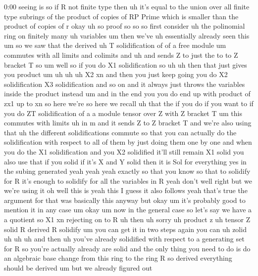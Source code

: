 \begin{unfinished}{0:00}
seeing  is  so  if  R  not  finite
type  then  uh  it's  equal  to  the  union
over  all  finite  type
subrings  of  the  product  of  copies  of  RP
Prime  which  is  smaller  than  the  product
of  copies  of
r
okay  uh  so  proof
so  so  so  first
consider  uh  the  polinomial  ring  on
finitely  many  uh
variables
um  then  we've  uh  essentially  already
seen
this  um  so  we  saw  that
the  derived  uh  T  solidification  of
of  a  free  module  um  commutes  with  all
limits  and  colimits  and  uh  and  sends  Z
to  just  the  to  to  Z  bracket  T  so  um
well  so  if  you  do  X1  solidification  so
uh  uh  then  that  just  gives  you
product
um
uh
uh
uh  X2  xn  and  then  you  just  keep  going
you  do  X2  solidification  X3
solidification  and  so  on  and  it  always
just  throws  the  variables  inside  the
product  instead  um  and  in  the  end  you
you  do  end  up  with  product  of  zx1  up  to
xn  so  here  we're  so  here  we
recall  uh  that  the  if  you  do  if  you  want
to  if  you  do  ZT
solidification  of  a  a  module  tensor  over
Z  with  Z  bracket  T  um  this  commutes  with
limits  uh  in  m  and  it
sends  Z  to  Z  bracket  T  and  we're  also
using  that  uh  the  different
solidifications
commute  so  that  you  can  actually  do  the
solidification  with  respect  to  all  of
them  by  just  doing  them  one  by  one  and
when  you  do  the  X1  solidification  and
you  X2  solidified  it'll  still  remain  X1
solid  you  also  use  that  if  you  solid  if
it's  X  and  Y  solid  then  it  is  Sol  for
everything  yes  in  the  subing  generated
yeah  yeah  yeah  exactly  so  that  you  know
so  that  to  solidify  for  R  it's  enough  to
solidify  for  all  the  variables  in  R  yeah
don't  well  right  but  we  we're  using  it
oh  well  this  is  yeah  this  I  guess  it
also  follows  yeah  that's  true  the
argument  for  that  was  basically  this
anyway  but  okay  um  it's  probably  good  to
mention  it  in  any
case
um  okay  um  now  in  the  general  case
so  let's  say  we  have  a  a  quotient  so  X1
xn  rejecting  on  to
R  uh
then  uh  sorry  uh  product
z  uh  tensor  Z  solid
R  derived  R
solidify  um  you  can  get  it  in  two  steps
again  you
can  uh  zolid  uh
uh  uh  and
then  uh  you've  already  solidified  with
respect  to  a  generating  set  for  R  so
you're  actually  already  are  solid  and
the  only  thing  you  need  to  do  is  do  an
algebraic  base  change  from  this  ring  to
the  ring  R  so  derived  everything  should
be
derived  um  but  we  already  figured  out

\end{unfinished}
